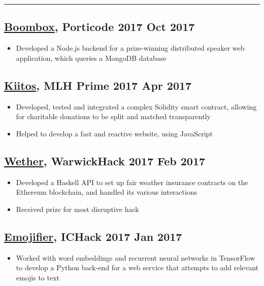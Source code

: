 \documentclass[a4paper, 8pt]{extarticle}
\begin{document}
\begin{minipage}[t]{.65\textwidth}
\vspace{-2pt}
\noindent\textcolor{lightgray}{\rule{\linewidth}{0.5pt}}

\subsection*{\href{https://devpost.com/software/boombox-s7zmce}{Boombox}, Porticode 2017 \hfill Oct 2017}
\begin{itemize}
\item Developed a Node.js backend for a prize-winning distributed speaker web application, which queries a MongoDB database
\end{itemize}

\subsection*{\href{https://devpost.com/software/kiitos}{Kiitos}, MLH Prime 2017 \hfill Apr 2017}
\begin{itemize}
\item Developed, tested and integrated a complex Solidity smart contract, allowing for charitable donations to be split and matched transparently
\item Helped to develop a fast and reactive website, using JavaScript
\end{itemize}

\subsection*{\href{https://devpost.com/software/weather-g8lp3r}{Wether}, WarwickHack 2017 \hfill Feb 2017}
\begin{itemize}
\item Developed a Haskell API to set up fair weather insurance contracts on the Ethereum blockchain, and handled its various interactions
\item Received prize for most disruptive hack
\end{itemize}

\subsection*{\href{https://devpost.com/software/emojifier}{Emojifier}, ICHack 2017 \hfill Jan 2017}
\begin{itemize}
\item Worked with word embeddings and recurrent neural networks in TensorFlow to develop a Python back-end for a web service that attempts to add relevant emojis to text
\end{itemize}

\end{minipage}%
\end{document}
